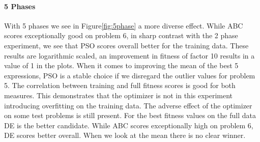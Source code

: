 \paragraph{5 Phases}
With 5 phases we see in Figure\ref{fig:5phase} a more diverse effect. While ABC scores exceptionally good on problem 6, in sharp contrast with the 2 phase experiment, we see that PSO scores overall better for the training data. These results are logarithmic scaled, an improvement in fitness of factor 10 results in a value of 1 in the plots. When it comes to improving the mean of the best 5 expressions, PSO is a stable choice if we disregard the outlier values for problem 5. The correlation between training and full fitness scores is good for both measures. This demonstrates that the optimizer is not in this experiment introducing overfitting on the training data. The adverse effect of the optimizer on some test problems is still present. For the best fitness values on the full data DE is the better candidate. While ABC scores exceptionally high on problem 6, DE scores better overall. When we look at the mean there is no clear winner. 
